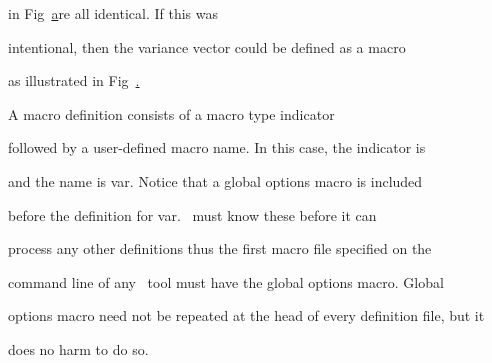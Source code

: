 in Fig~\href{f:hmm2def} are all identical.  If this was


intentional, then the variance vector could be defined as a macro


as illustrated in Fig~\href{f:mac5def}.  





A macro definition consists of a macro type indicator


followed by a user-defined macro name.  In this case, the indicator is 


and the name is \textsf{var}. Notice that a global options macro is included


before the definition for \textsf{var}. \HTK\ must know these before it can


process any other definitions thus the first macro file specified on the


command line of any \HTK\ tool must have the global options macro.  Global


options macro need not be repeated at the head of every definition file, but it


does no harm to do so.





